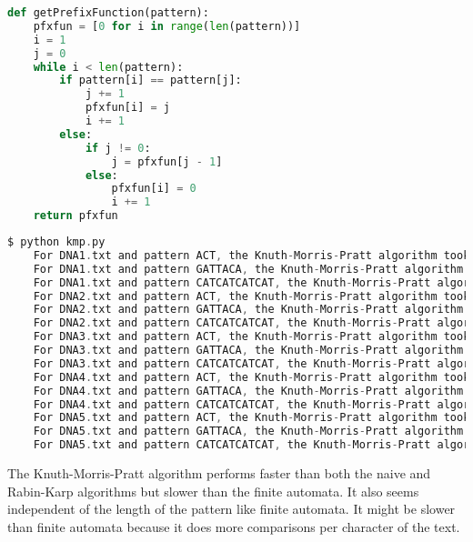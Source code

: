 \documentclass[12pt]{article}
\newenvironment{problem}[2][Problem]{\begin{trivlist}
\item[\hskip \labelsep {\bfseries #1}\hskip \labelsep {\bfseries #2.}]}{\end{trivlist}}
\begin{document}
\begin{problem}{4}
\begin{lstlisting}[language=Python, caption=Knuth-Morris-Pratt algorithm]
def getPrefixFunction(pattern):
    pfxfun = [0 for i in range(len(pattern))]
    i = 1
    j = 0
    while i < len(pattern):
        if pattern[i] == pattern[j]:
            j += 1
            pfxfun[i] = j
            i += 1
        else:
            if j != 0:
                j = pfxfun[j - 1]
            else:
                pfxfun[i] = 0
                i += 1
    return pfxfun
\end{lstlisting}
\pagebreak
\begin{lstlisting}[language=C, caption=Terminal output running code]
    $ python kmp.py 
    For DNA1.txt and pattern ACT, the Knuth-Morris-Pratt algorithm took 0.2486665429896675 seconds with 65495 matches
    For DNA1.txt and pattern GATTACA, the Knuth-Morris-Pratt algorithm took 0.2490224240027601 seconds with 242 matches
    For DNA1.txt and pattern CATCATCATCAT, the Knuth-Morris-Pratt algorithm took 0.24674882799445186 seconds with 0 matches
    For DNA2.txt and pattern ACT, the Knuth-Morris-Pratt algorithm took 0.4929636379965814 seconds with 131034 matches
    For DNA2.txt and pattern GATTACA, the Knuth-Morris-Pratt algorithm took 0.4923475959949428 seconds with 491 matches
    For DNA2.txt and pattern CATCATCATCAT, the Knuth-Morris-Pratt algorithm took 0.49851692000811454 seconds with 1 matches
    For DNA3.txt and pattern ACT, the Knuth-Morris-Pratt algorithm took 0.9728445020009531 seconds with 262192 matches
    For DNA3.txt and pattern GATTACA, the Knuth-Morris-Pratt algorithm took 0.7028228560084244 seconds with 1002 matches
    For DNA3.txt and pattern CATCATCATCAT, the Knuth-Morris-Pratt algorithm took 0.704158250009641 seconds with 1 matches
    For DNA4.txt and pattern ACT, the Knuth-Morris-Pratt algorithm took 1.40684947000409 seconds with 524454 matches
    For DNA4.txt and pattern GATTACA, the Knuth-Morris-Pratt algorithm took 1.424388044004445 seconds with 1976 matches
    For DNA4.txt and pattern CATCATCATCAT, the Knuth-Morris-Pratt algorithm took 1.4213517800089903 seconds with 5 matches
    For DNA5.txt and pattern ACT, the Knuth-Morris-Pratt algorithm took 2.793876569994609 seconds with 1050689 matches
    For DNA5.txt and pattern GATTACA, the Knuth-Morris-Pratt algorithm took 2.8016387920069974 seconds with 4161 matches
    For DNA5.txt and pattern CATCATCATCAT, the Knuth-Morris-Pratt algorithm took 2.790721905999817 seconds with 3 matches
\end{lstlisting}
The Knuth-Morris-Pratt algorithm performs faster than both the naive and Rabin-Karp algorithms but slower than the finite automata. It also seems independent of the length of the pattern like finite automata. It might be slower than finite automata because it does more comparisons per character of the text.
\end{problem}

 
\end{document}

